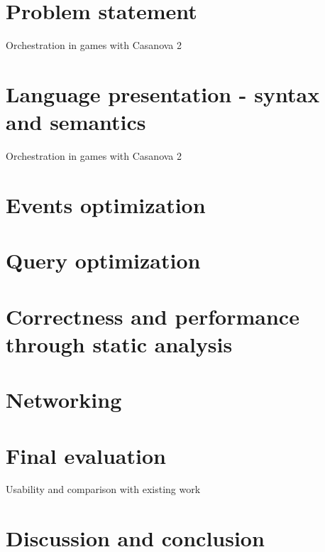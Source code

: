 \documentclass[10pt,a4paper]{article}
\begin{document}
\section{Problem statement}
Orchestration in games with Casanova 2
\section{Language presentation - syntax and semantics}
Orchestration in games with Casanova 2
\section{Events optimization}
\section{Query optimization}
\section{Correctness and performance through static analysis}
\section{Networking}
\section{Final evaluation}
Usability and comparison with existing work
\section{Discussion and conclusion}
\end{document}
